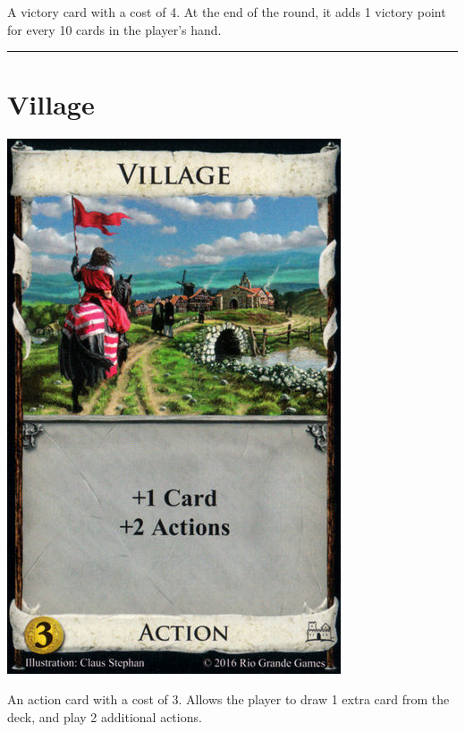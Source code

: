\documentclass[11pt]{article}
\begin{document}
A victory card with a cost of 4. At the end of the round, it adds 1 victory point for every 10 cards in the player's hand.

\noindent\rule{\textwidth}{0.5pt}

\section*{Village}
\label{sec:org7af6c4e}


\begin{center}
\includegraphics[width=0.25\linewidth]{./assets/village.jpg}
\end{center}

An action card with a cost of 3. Allows the player to draw 1 extra card from the deck, and play 2 additional actions.
\end{document}
